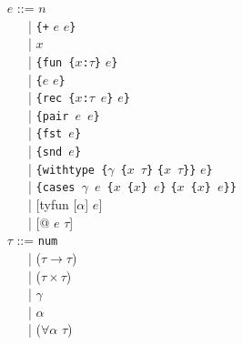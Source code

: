 \begin{enumerate}
{
~~~~~~~ $e$ ::= $n$\\
\hspace*{0em}
~~~~~~~~~~~| \verb!{+! $e$ $e$\verb+}+\\
\hspace*{0em}
~~~~~~~~~~~| $x$\\
\hspace*{0em}
~~~~~~~~~~~| \verb+{fun {+$x$\verb+:+$\tau$\verb+}+ $e$\verb+}+\\
\hspace*{0em}
~~~~~~~~~~~| \verb+{+$e$ $e$\verb+}+\\
\hspace*{0em}
~~~~~~~~~~~| \verb+{rec {+$x$\verb+:+$\tau$\ $e$\verb+}+ $e$\verb+}+\\
\hspace*{0em}
~~~~~~~~~~~| \verb+{pair +$e$\ $e$\verb+}+\\
\hspace*{0em}
~~~~~~~~~~~| \verb+{fst +$e$\verb+}+\\
\hspace*{0em}
~~~~~~~~~~~| \verb+{snd +$e$\verb+}+\\
\hspace*{0em}
~~~~~~~~~~~| \verb+{withtype {+$\gamma$\ \verb+{+$x$\ $\tau$\verb+}+
\verb+{+$x$\ $\tau$\verb+}}+ $e$\verb+}+\\
\hspace*{0em}
~~~~~~~~~~~| \verb+{cases +$\gamma$\ $e$\ 
\verb+{+$x$\ \verb+{+$x$\verb+}+\ $e$\verb+}+
\verb+{+$x$\ \verb+{+$x$\verb+}+\ $e$\verb+}}+\\
\hspace*{0em}
~~~~~~~~~~~| [tyfun [$\alpha$] $e$]\\
\hspace*{0em}
~~~~~~~~~~~| [@ $e$ $\tau$]\\

~~~~~~~ $\tau$ ::= \mbox{\texttt{num}}\\
\hspace*{0em}
~~~~~~~~~~~| ($\tau\rightarrow\tau$)\\
\hspace*{0em}
~~~~~~~~~~~| ($\tau \times \tau$)\\
\hspace*{0em}
~~~~~~~~~~~| $\gamma$\\
\hspace*{0em}
~~~~~~~~~~~| $\alpha$\\
\hspace*{0em}
~~~~~~~~~~~| ($\forall \alpha$ $\tau$)\\

}
\end{enumerate}
